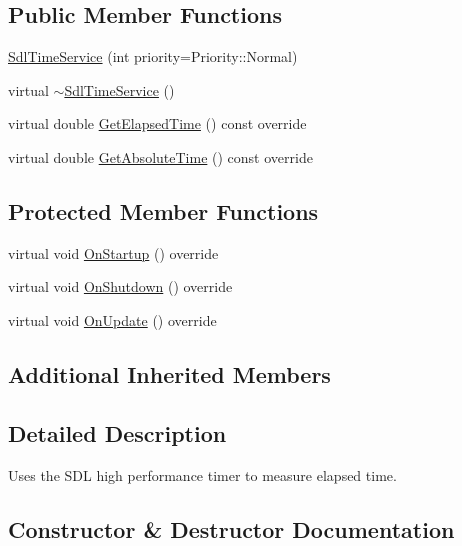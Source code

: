 \subsection*{Public Member Functions}
\begin{DoxyCompactItemize}
\item 
\hyperlink{classastu_1_1SdlTimeService_acceb8055d799af777b424d78e305ed58}{Sdl\+Time\+Service} (int priority=Priority\+::\+Normal)
\item 
virtual \hyperlink{classastu_1_1SdlTimeService_a41d6e3b0011d41a197ea625722e1a6be}{$\sim$\+Sdl\+Time\+Service} ()
\item 
virtual double \hyperlink{classastu_1_1SdlTimeService_a6652d19cae14e20ec85a1808fc8e87b7}{Get\+Elapsed\+Time} () const override
\item 
virtual double \hyperlink{classastu_1_1SdlTimeService_ab1cd9c0977c8b93cc4cdee22e0107bde}{Get\+Absolute\+Time} () const override
\end{DoxyCompactItemize}
\subsection*{Protected Member Functions}
\begin{DoxyCompactItemize}
\item 
virtual void \hyperlink{classastu_1_1SdlTimeService_ac11551691bb14289020028a2a162c7d6}{On\+Startup} () override
\item 
virtual void \hyperlink{classastu_1_1SdlTimeService_a6a1b864beed186413933dd8b97a393a2}{On\+Shutdown} () override
\item 
virtual void \hyperlink{classastu_1_1SdlTimeService_ada8347f0f665616a2202919e71b76302}{On\+Update} () override
\end{DoxyCompactItemize}
\subsection*{Additional Inherited Members}


\subsection{Detailed Description}
Uses the S\+DL high performance timer to measure elapsed time. 

\subsection{Constructor \& Destructor Documentation}
\mbox{\label{classastu_1_1SdlTimeService_acceb8055d799af777b424d78e305ed58}} 
